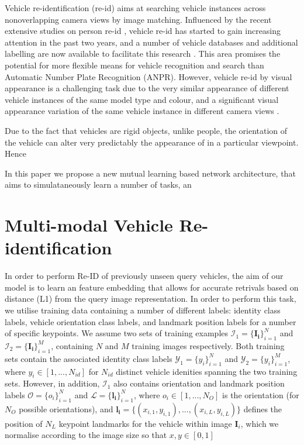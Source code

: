 \documentclass[10pt,twocolumn,letterpaper]{article}
\begin{document}
Vehicle re-identification (re-id) aims at searching vehicle instances across nonoverlapping camera views by image matching. Influenced by the recent extensive studies on person re-id \cite{gong2014re}, vehicle re-id has started to gain increasing attention in the past two years, and a number of vehicle databases and additional labelling are now available to facilitate this research \cite{liu2016vehicleid,liu2016veri,yang2015large,kanaci2018vehicle,wang2017orientation}. This area promises the potential for more flexible means for vehicle recognition and search than Automatic Number Plate Recognition (ANPR). However, vehicle re-id by visual appearance is a
challenging task due to the very similar appearance of different vehicle instances
of the same model type and colour, and a significant visual appearance variation
of the same vehicle instance in different camera views \cite{}.


Due to the fact that vehicles are rigid objects, unlike people, the orientation of the vehicle can alter very predictably the appearance of in a particular viewpoint. Hence

In this paper we propose a new mutual learning based network architecture, that aims to simulataneously learn a number of tasks, an

\section{Multi-modal Vehicle Re-identification}

In order to perform Re-ID of previously unseen query vehicles, the aim of our model is to learn an feature embedding that allows for accurate retrivals based on distance (\eg L1) from the query image representation. In order to perform this task, we utilise training data containing a number of different labels: identity class labels, vehicle orientation class labels, and landmark position labels for a number of specific keypoints. We assume two sets of training examples $\mathcal{I}_1 = \{\mathbf{I_i}\}_{i=1}^N$ and $\mathcal{I}_2 = \{\mathbf{I_i}\}_{i=1}^M$, containing $N$ and $M$ training images respectively. Both training sets contain the associated identity class labels $\mathcal{Y}_1=\{y_i\}_{i=1}^N$ and $\mathcal{Y}_2=\{y_i\}_{i=1}^M$, where $y_i \in \left[1,...,N_{id}\right]$ for $N_{id}$ distinct vehicle idenities spanning the two training sets. However, in addition, $\mathcal{I}_1$ also contains orientation and landmark position labels $\mathcal{O}=\{o_i\}_{i=1}^N$ and $\mathcal{L}=\{\mathbf{l_i}\}_{i=1}^N$, where $o_i \in \left[1,...,N_O\right]$ is the orientation (for $N_O$ possible orientations), and  $\mathbf{l_i}=\{\left(x_{i,1},y_{i,1}\right),...,\left(x_{i,L},y_{i,L}\right)\}$ defines the position of $N_L$ keypoint landmarks for the vehicle within image $\mathbf{I}_i$, which we normalise according to the image size so that $x,y \in [0,1]$
\end{document}
